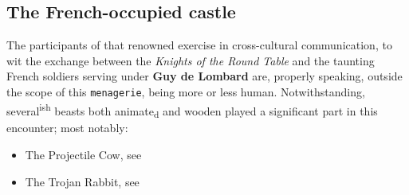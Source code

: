 \documentclass{metanorma}
\begin{document}

\subsection{The French-occupied castle}


The participants of that renowned exercise in cross-cultural
communication, to wit the exchange between the
\textit{Knights of the Round Table}
and the taunting French soldiers serving under 
\textbf{Guy de Lombard} are,
properly speaking, outside the scope of this \texttt{menagerie}, being more
or less human. Notwithstanding, several\textsuperscript{ish} beasts both animate\textsubscript{d}
and wooden played a significant part in this encounter; most
notably:

\begin{itemize}
  \item The Projectile Cow, see 
  \item The Trojan Rabbit, see 
\end{itemize}

\end{document}
